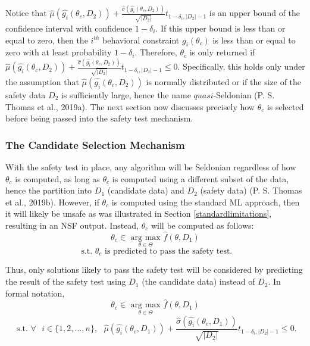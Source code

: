 \documentclass[12pt, twoside]{amherstthesis}
\begin{document}
Notice that \(\hat{\mu}(\hat{g_i}(\theta_c, D_2)) + \frac{\hat{\sigma}(\hat{g_i}(\theta_c, D_2))}{\sqrt{|D_2|}}t_{1-\delta_i, |D_2|-1}\) is an upper bound of the confidence interval with confidence \(1-\delta_i\). If this upper bound is less than or equal to zero, then the \(i^{th}\) behavioral constraint \(g_i(\theta_c)\) is less than or equal to zero with at least probability \(1-\delta_i\). Therefore, \(\theta_c\) is only returned if \(\hat{\mu}(\hat{g_i}(\theta_c, D_2)) + \frac{\hat{\sigma}(\hat{g_i}(\theta_c, D_2))}{\sqrt{|D_2|}}t_{1-\delta_i, |D_2|-1} \leq 0\). Specifically, this holds only under the assumption that \(\hat{\mu}(\hat{g_i}(\theta_c, D_2))\) is normally distributed or if the size of the safety data \(D_2\) is sufficiently large, hence the name \(\textit{quasi}\)-Seldonian (P. S. Thomas et al., 2019a). The next section now discusses precisely how \(\theta_c\) is selected before being passed into the safety test mechanism.

\hypertarget{candidate}{%
\subsubsection{The Candidate Selection Mechanism}\label{candidate}}

With the safety test in place, any algorithm will be Seldonian regardless of how \(\theta_c\) is computed, as long as \(\theta_c\) is computed using a different subset of the data, hence the partition into \(D_1\) (candidate data) and \(D_2\) (safety data) (P. S. Thomas et al., 2019b). However, if \(\theta_c\) is computed using the standard ML approach, then it will likely be unsafe as was illustrated in Section \ref{standardlimitations}, resulting in an NSF output. Instead, \(\theta_c\) will be computed as follows:
\begin{equation}
\label{ch2eq12}
\theta_c \in \underset{\theta \in \Theta}{\text{ arg max }} \hat{f}(\theta, D_1)
\end{equation}
\[\text{ s.t. } \theta_c \text{ is predicted to pass the safety test}.\]

Thus, only solutions likely to pass the safety test will be considered by predicting the result of the safety test using \(D_1\) (the candidate data) instead of \(D_2\). In formal notation,
\begin{equation}
\label{ch2eq13}
\theta_c \in \underset{\theta \in \Theta}{\text{ arg max }} \hat{f}(\theta, D_1)
\end{equation}
\[ \text{ s.t. } \forall \text{ } i \in \{1,2,\ldots,n\}, \text{  } \hat{\mu}(\hat{g_i}(\theta_c, D_1)) + \frac{\hat{\sigma}(\hat{g_i}(\theta_c, D_1))}{\sqrt{|D_2|}}t_{1-\delta_i, |D_2|-1} \leq 0. \]
\end{document}
